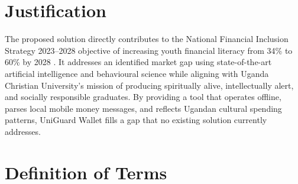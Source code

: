 \documentclass[12pt,a4paper]{report}
\begin{document}
\section{Justification}

The proposed solution directly contributes to the National Financial Inclusion Strategy 2023--2028 objective of increasing youth financial literacy from 34\% to 60\% by 2028 \citep{MoFPED2023}. It addresses an identified market gap using state-of-the-art artificial intelligence and behavioural science while aligning with Uganda Christian University's mission of producing spiritually alive, intellectually alert, and socially responsible graduates. By providing a tool that operates offline, parses local mobile money messages, and reflects Ugandan cultural spending patterns, UniGuard Wallet fills a gap that no existing solution currently addresses.

\section{Definition of Terms}
\end{document}
